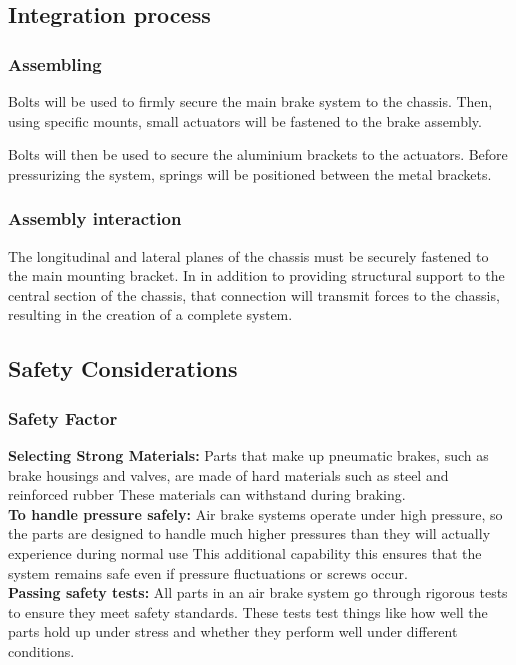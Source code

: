 \subsection{Integration process}
\subsubsection{Assembling}
Bolts will be used to firmly secure the main brake system to the chassis. Then, using specific mounts, small actuators will be fastened to the brake assembly.

Bolts will then be used to secure the aluminium brackets to the actuators. Before pressurizing the system, springs will be positioned between the metal brackets.




\subsubsection{Assembly interaction}
The longitudinal and lateral planes of the chassis must be securely fastened to the main mounting bracket. In in addition to providing structural support to the central section of the chassis, that connection will transmit forces to the chassis, resulting in the creation of a complete system.



\subsection{Safety Considerations}
\subsubsection{Safety Factor}
\textbf{Selecting Strong Materials:} Parts that make up pneumatic brakes, such as brake housings and valves, are made of hard materials such as steel and reinforced rubber These materials can withstand during braking.\\

\noindent
\textbf{To handle pressure safely:} Air brake systems operate under high pressure, so the parts are designed to handle much higher pressures than they will actually experience during normal use This additional capability this ensures that the system remains safe even if pressure fluctuations or screws occur.\\

\noindent
\textbf{Passing safety tests:} All parts in an air brake system go through rigorous tests to ensure they meet safety standards. These tests test things like how well the parts hold up under stress and whether they perform well under different conditions.\\

